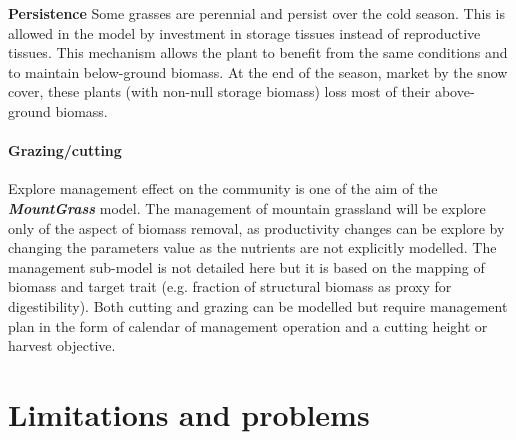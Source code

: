\documentclass[a4paper,twoside, justified,marginals=raggedright, nobib]{tufte-handout}
\newcommand{\model}{\textit{\textbf{MountGrass }}}
\begin{document}
\textbf{Persistence} Some grasses are perennial and persist over the cold season. This is allowed in the model by investment in storage tissues instead of reproductive tissues. This mechanism allows the plant to benefit from the same conditions and to maintain below-ground biomass. At the end of the season, market by the snow cover, these plants (with non-null storage biomass) loss most of their above-ground biomass.

\paragraph{Grazing/cutting} Explore management effect on the community is one of the aim of the \model model. The management of mountain grassland will be explore only of the aspect of biomass removal, as productivity changes can be explore by changing the parameters value as the nutrients are not explicitly modelled. The management sub-model is not detailed here but it is based on the mapping of biomass and target trait (e.g. fraction of structural biomass as proxy for digestibility). Both cutting and grazing can be modelled but require management plan in the form of calendar of management operation and a cutting height or harvest objective.\\

\section{Limitations and problems}
\end{document}
